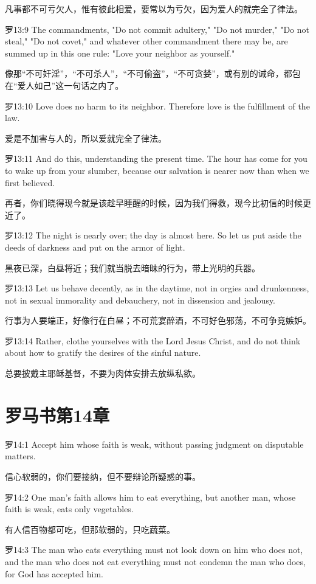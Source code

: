 \documentclass[a4paper,11pt,onecolumn,twoside]{ctexart}
\begin{document}
\begin{multicols}{2}
 凡事都不可亏欠人，惟有彼此相爱，要常以为亏欠，因为爱人的就完全了律法。


 罗13:9
 The commandments, "Do not commit adultery," "Do not murder," "Do not steal," "Do not covet," and whatever other commandment there may be, are summed up in this one rule: "Love your neighbor as yourself."

 像那“不可奸淫”，“不可杀人”，“不可偷盗”，“不可贪婪”，或有别的诫命，都包在“爱人如己”这一句话之内了。


 罗13:10
 Love does no harm to its neighbor. Therefore love is the fulfillment of the law.

 爱是不加害与人的，所以爱就完全了律法。


 罗13:11
 And do this, understanding the present time. The hour has come for you to wake up from your slumber, because our salvation is nearer now than when we first believed.

 再者，你们晓得现今就是该趁早睡醒的时候，因为我们得救，现今比初信的时候更近了。


 罗13:12
 The night is nearly over; the day is almost here. So let us put aside the deeds of darkness and put on the armor of light.

 黑夜已深，白昼将近；我们就当脱去暗昧的行为，带上光明的兵器。


 罗13:13
 Let us behave decently, as in the daytime, not in orgies and drunkenness, not in sexual immorality and debauchery, not in dissension and jealousy.

 行事为人要端正，好像行在白昼；不可荒宴醉酒，不可好色邪荡，不可争竞嫉妒。


 罗13:14
 Rather, clothe yourselves with the Lord Jesus Christ, and do not think about how to gratify the desires of the sinful nature.

 总要披戴主耶稣基督，不要为肉体安排去放纵私欲。


\section{ 罗马书第14章}
 罗14:1
 Accept him whose faith is weak, without passing judgment on disputable matters.

 信心软弱的，你们要接纳，但不要辩论所疑惑的事。


 罗14:2
 One man's faith allows him to eat everything, but another man, whose faith is weak, eats only vegetables.

 有人信百物都可吃，但那软弱的，只吃蔬菜。


 罗14:3
 The man who eats everything must not look down on him who does not, and the man who does not eat everything must not condemn the man who does, for God has accepted him.


\end{multicols}
\end{document}
